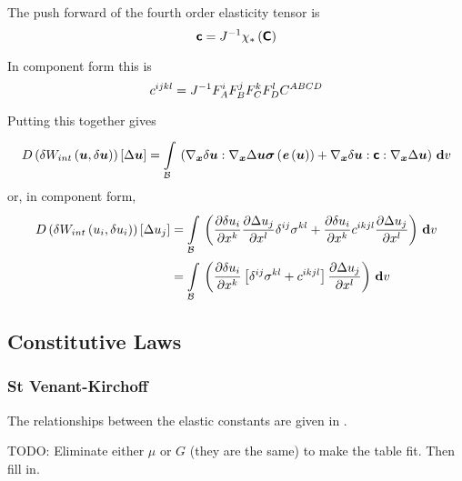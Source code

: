 The push forward of the fourth order elasticity tensor is
\begin{equation}
  \boldsymbol{\mathsf{c}}={J}^{-1} \chi_{*}\left( \boldsymbol{\mathsf{C}} \right) 
\end{equation}

In component form this is
\begin{equation}
  c^{ijkl}={J}^{-1}F^{i}_{A}F^{j}_{B}F^{k}_{C}F^{l}_{D}C^{ABCD}
\end{equation}

Putting this together gives
\begin{equation}
  \directionalderiv{\delta\fnof{W_{int}}{\vectr{u},\delta\vectr{u}}}{\Delta\vectr{u}}=
  \gint{\embedmanifold{B}}{}{\pbrac{\doubledotprod{\gradient{\vectr{x}}{\delta\vectr{u}}}{\gradient{\vectr{x}}{\Delta\vectr{u}}\fnof{\tensor{\sigma}}{\fnof{\tensor{e}}{\vectr{u}}}}+
      \doubledotprod{\gradient{\vectr{x}}{\delta\vectr{u}}}{\doubledotprod{\tensorfour{c}}{\gradient{\vectr{x}}{\Delta\vectr{u}}}}}}{v}
\end{equation}
or, in component form,
\begin{equation}
  \begin{split}
       D\left( \delta W_{int}\left( u_{i},\delta u_{i} \right)  \right) \left[ \Delta u_{j} \right]  &=
      \displaystyle\int\limits_{ \mathcal{B} }^{} \,\left(  \dfrac{\partial \delta u_{i}}{\partial x^{k}}  \dfrac{\partial \Delta
          u_{j}}{\partial x^{l}}  \delta^{{i}{j}} \sigma^{kl}+
         \dfrac{\partial \delta u_{i}}{\partial x^{k}} c^{ikjl} \dfrac{\partial \Delta u_{j}}{\partial x^{l}}  \right)\, \boldsymbol{\mathrm{d}}  v \\
    &=  \displaystyle\int\limits_{ \mathcal{B} }^{} \,\left(  \dfrac{\partial \delta
          u_{i}}{\partial x^{k}} \left[  \delta^{{i}{j}} \sigma^{kl}+c^{ikjl} \right] \dfrac{\partial \Delta u_{j}}{\partial x^{l}}  \right)\, \boldsymbol{\mathrm{d}}  v 
  \end{split}
\end{equation}

\subsection{Constitutive Laws}

\subsubsection{St Venant-Kirchoff}

The relationships between the elastic constants are given in .

TODO: Eliminate either $\mu$ or $G$ (they are the same) to make the table
fit. Then fill in.

